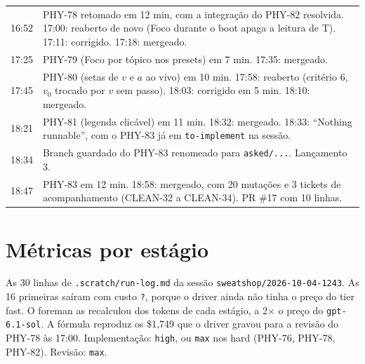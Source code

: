 \documentclass[11pt,a4paper]{article}
\begin{document}
\begin{tabularx}{\linewidth}{@{}lX@{}}
16:52 & PHY-78 retomado em 12 min, com a integração do PHY-82 resolvida.
        17:00: reaberto de novo (Foco durante o boot apaga a leitura de T).
        17:11: corrigido. 17:18: mergeado.\\
17:25 & PHY-79 (Foco por tópico nos presets) em 7 min. 17:35: mergeado.\\
17:45 & PHY-80 (setas de $v$ e $a$ ao vivo) em 10 min. 17:58: reaberto
        (critério 6, $v_0$ trocado por $v$ sem passo). 18:03: corrigido em
        5 min. 18:10: mergeado.\\
18:21 & PHY-81 (legenda clicável) em 11 min. 18:32: mergeado. 18:33:
        ``Nothing runnable'', com o PHY-83 já em \texttt{to-implement} na
        sessão.\\
18:34 & Branch guardado do PHY-83 renomeado para \texttt{asked/...}.
        Lançamento 3.\\
18:47 & PHY-83 em 12 min. 18:58: mergeado, com 20 mutações e 3 tickets de
        acompanhamento (CLEAN-32 a CLEAN-34). PR \#17 com 10 linhas.\\
\bottomrule
\end{tabularx}

\section{Métricas por estágio}

As 30 linhas de \texttt{.scratch/run-log.md} da sessão
\texttt{sweatshop/2026-10-04-1243}. As 16 primeiras saíram com custo
\texttt{?}, porque o driver ainda não tinha o preço do tier fast. O foreman as
recalculou dos tokens de cada estágio, a 2$\times$ o preço do
\texttt{gpt-6.1-sol}. A fórmula reproduz os \$1,749 que o driver gravou
para a revisão do PHY-78 às 17:00. Implementação: \texttt{high}, ou \texttt{max}
nos hard (PHY-76, PHY-78, PHY-82). Revisão: \texttt{max}.
\end{document}
